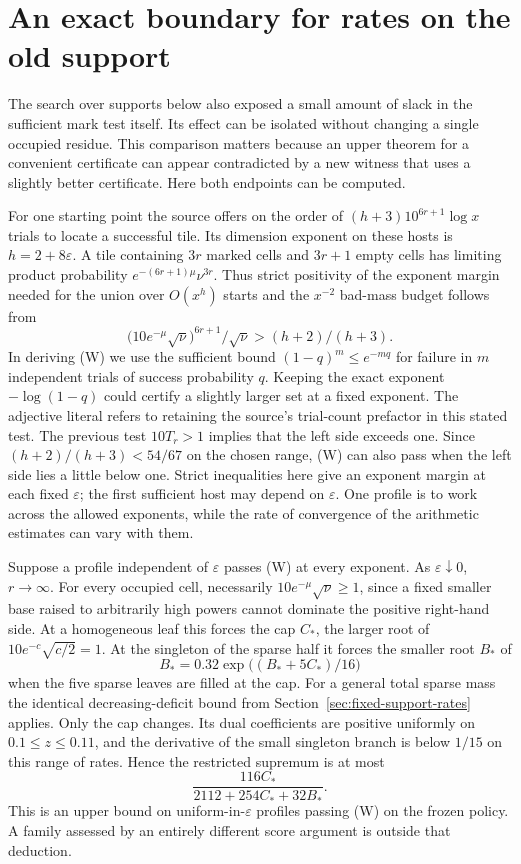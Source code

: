 \section{An exact boundary for rates on the old support}
The search over supports below also exposed a small amount of slack in the sufficient mark test itself. Its effect can be isolated without changing a single occupied residue. This comparison matters because an upper theorem for a convenient certificate can appear contradicted by a new witness that uses a slightly better certificate. Here both endpoints can be computed.

For one starting point the source offers on the order of \((h+3)10^{6r+1}\log x\) trials to locate a successful tile. Its dimension exponent on these hosts is \(h=2+8\varepsilon\). A tile containing \(3r\) marked cells and \(3r+1\) empty cells has limiting product probability \(e^{-(6r+1)\mu}\nu^{3r}\). Thus strict positivity of the exponent margin needed for the union over \(O(x^h)\) starts and the \(x^{-2}\) bad-mass budget follows from
\[
 \bigl(10e^{-\mu}\sqrt{\nu}\bigr)^{6r+1}/\sqrt{\nu}
               > (h+2)/(h+3).                             \tag{W}
\]
In deriving (W) we use the sufficient bound \((1-q)^m\le e^{-mq}\) for failure in \(m\) independent trials of success probability \(q\). Keeping the exact exponent \(-\log(1-q)\) could certify a slightly larger set at a fixed exponent. The adjective literal refers to retaining the source's trial-count prefactor in this stated test. The previous test \(10T_r>1\) implies that the left side exceeds one. Since \((h+2)/(h+3)<54/67\) on the chosen range, (W) can also pass when the left side lies a little below one. Strict inequalities here give an exponent margin at each fixed \(\varepsilon\); the first sufficient host may depend on \(\varepsilon\). One profile is to work across the allowed exponents, while the rate of convergence of the arithmetic estimates can vary with them.

Suppose a profile independent of \(\varepsilon\) passes (W) at every exponent. As \(\varepsilon\downarrow0\), \(r\to\infty\). For every occupied cell, necessarily \(10e^{-\mu}\sqrt\nu\ge1\), since a fixed smaller base raised to arbitrarily high powers cannot dominate the positive right-hand side. At a homogeneous leaf this forces the cap \(C_*\), the larger root of \(10e^{-c}\sqrt{c/2}=1\). At the singleton of the sparse half it forces the smaller root \(B_*\) of
\[
 B_*=0.32\exp\bigl((B_*+5C_*)/16\bigr)
\]
when the five sparse leaves are filled at the cap. For a general total sparse mass the identical decreasing-deficit bound from Section~\ref{sec:fixed-support-rates} applies. Only the cap changes. Its dual coefficients are positive uniformly on \(0.1\le z\le0.11\), and the derivative of the small singleton branch is below \(1/15\) on this range of rates. Hence the restricted supremum is at most
\[
   \frac{116 C_*}{2112+254 C_*+32 B_*}.
\]
This is an upper bound on uniform-in-\(\varepsilon\) profiles passing (W) on the frozen policy. A family assessed by an entirely different score argument is outside that deduction.

